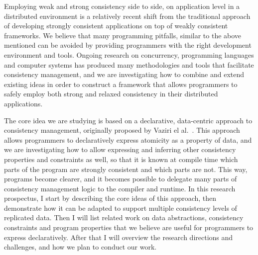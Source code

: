 \documentclass[]{usiinfprospectus}
\begin{document}
%
%
Employing weak and strong consistency side to side, on application level in a distributed environment is a relatively recent shift from the traditional approach of developing strongly consistent applications on top of weakly consistent frameworks. We believe that many programming pitfalls, similar to the above mentioned can be avoided by providing programmers with the right development environment and tools. Ongoing research on concurrency, programming languages and computer systems has produced many methodologies and tools that facilitate consistency management, and we are investigating how to combine and extend existing ideas in order to construct a framework that allows programmers to safely employ both strong and relaxed consistency in their distributed applications. 

The core idea we are studying is based on a declarative, data-centric approach to consistency management, originally proposed by Vaziri el al.~\cite{Vaziri:2006:ASC:1111320.1111067}. This approach allows programmers to declaratively express atomicity as a property of data, and we are investigating how to allow expressing and inferring other consistency properties and constraints as well, so that it is known at compile time which parts of the program are strongly consistent and which parts are not. This way, programs become clearer, and it becomes possible to delegate many parts of consistency management logic to the compiler and runtime. 
In this research prospectus, I start by describing the core ideas of this approach, then demonstrate how it can be adapted to support multiple consistency levels of replicated data. Then I will list related work on data abstractions, consistency constraints and program properties that we believe are useful for programmers to express declaratively. After that I will overview the research directions and challenges, and how we plan to conduct our work.
\end{document}

